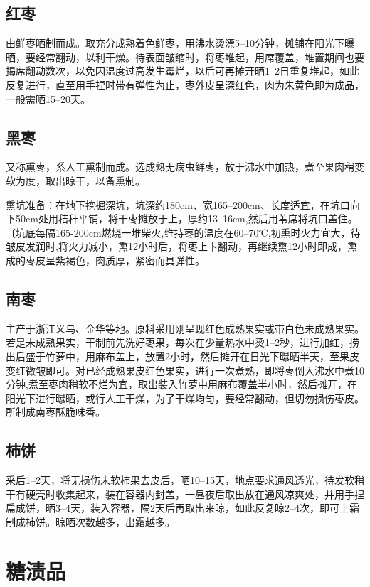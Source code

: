 \documentclass{ctexbook}
\begin{document}
\subsection{红枣}
由鲜枣晒制而成。取充分成熟着色鲜枣，用沸水烫漂5--10分钟，摊铺在阳光下曝晒，要经常翻动，以利干燥。待表面皱缩时，将枣堆起，用席覆盖，堆置期间也要揭席翻动数次，以免因温度过高发生霉烂，以后可再摊开晒1--2日重复堆起，如此反复进行，直至用手捏时带有弹性为止，枣外皮呈深红色，肉为朱黄色即为成品，一般需晒15--20天。
\subsection{黑枣}
又称熏枣，系人工熏制而成。选成熟无病虫鲜枣，放于沸水中加热，煮至果肉稍变软为度，取出晾干，以备熏制。

熏坑准备：在地下挖掘深坑，坑深约180cm、宽165--200cm、长度适宜，在坑口向下50cm处用秸秆平铺，将干枣摊放于上，厚约13--16cm,然后用苇席将坑口盖住。〔坑底每隔165-200cm燃烧一堆柴火,维持枣的温度在60--70℃,初熏时火力宜大，待皱皮发润时,将火力减小，熏12小时后，将枣上卞翻动，再继续熏12小时即成，熏成的枣皮呈紫褐色，肉质厚，紧密而具弹性。
\subsection{南枣}
主产于浙江义乌、金华等地。原料采用刚呈现红色成熟果实或带白色未成熟果实。若是未成熟果实，干制前先洗好枣果，每次在少量热水中烫1--2秒，进行加红，捞出后盛于竹萝中，用麻布盖上，放置2小时，然后摊开在日光下曝晒半天，至果皮变红微皱即可。对已经成熟果皮红色果实，进行一次煮熟，即将枣倒入沸水中煮10分钟,煮至枣肉稍软不烂为宜，取出装入竹萝中用麻布覆盖半小时，然后摊开，在阳光下进行曝晒，或行人工干燥，为了干燥均匀，要经常翻动，但切勿损伤枣皮。所制成南枣酥脆味香。
\subsection{柿饼}
采后1--2天，将无损伤未软柿果去皮后，晒10--15天，地点要求通风透光，待发软稍干有硬壳时收集起来，装在容器内封盖，一昼夜后取出放在通风凉爽处，并用手捏扁成饼，晒3--4天，装入容器，隔2天后再取出来晾，如此反复晾2--4次，即可上霜制成柿饼。晾晒次数越多，出霜越多。
\section{糖渍品}
\end{document}
